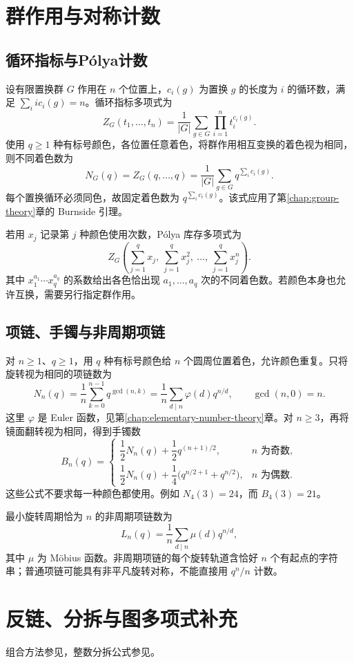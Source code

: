 \documentclass[../main.tex]{subfiles}
\begin{document}
\section{群作用与对称计数}
\subsection{循环指标与Pólya计数}
设有限置换群 $G$ 作用在 $n$ 个位置上，$c_i(g)$ 为置换 $g$ 的长度为 $i$ 的循环数，满足 $\sum_i i c_i(g)=n$。循环指标多项式为
\[
Z_G(t_1,\ldots,t_n)=\frac1{|G|}\sum_{g\in G}\prod_{i=1}^n t_i^{c_i(g)}.
\]
使用 $q\ge1$ 种有标号颜色，各位置任意着色，将群作用相互变换的着色视为相同，则不同着色数为
\[
N_G(q)=Z_G(q,\ldots,q)=\frac1{|G|}\sum_{g\in G}q^{\sum_i c_i(g)}.
\]
每个置换循环必须同色，故固定着色数为 $q^{\sum_i c_i(g)}$。该式应用了第\ref{chap:group-theory}章的 Burnside 引理。

若用 $x_j$ 记录第 $j$ 种颜色使用次数，Pólya 库存多项式为
\[
Z_G\!\left(\sum_{j=1}^q x_j,\ \sum_{j=1}^q x_j^2,\ \ldots,\ \sum_{j=1}^q x_j^n\right).
\]
其中 $x_1^{a_1}\cdots x_q^{a_q}$ 的系数给出各色恰出现 $a_1,\ldots,a_q$ 次的不同着色数。若颜色本身也允许互换，需要另行指定群作用。

\subsection{项链、手镯与非周期项链}
对 $n\ge1$、$q\ge1$，用 $q$ 种有标号颜色给 $n$ 个圆周位置着色，允许颜色重复。只将旋转视为相同的项链数为
\[
N_n(q)=\frac1n\sum_{k=0}^{n-1}q^{\gcd(n,k)}
=\frac1n\sum_{d\mid n}\varphi(d)q^{n/d},\qquad\gcd(n,0)=n.
\]
这里 $\varphi$ 是 Euler 函数，见第\ref{chap:elementary-number-theory}章。对 $n\ge3$，再将镜面翻转视为相同，得到手镯数
\[
B_n(q)=\begin{cases}
\dfrac12N_n(q)+\dfrac12q^{(n+1)/2},&n\text{ 为奇数},\\[4pt]
\dfrac12N_n(q)+\dfrac14\bigl(q^{n/2+1}+q^{n/2}\bigr),&n\text{ 为偶数}.
\end{cases}
\]
这些公式不要求每一种颜色都使用。例如 $N_4(3)=24$，而 $B_4(3)=21$。

最小旋转周期恰为 $n$ 的非周期项链数为
\[
L_n(q)=\frac1n\sum_{d\mid n}\mu(d)q^{n/d},
\]
其中 $\mu$ 为 Möbius 函数。非周期项链的每个旋转轨道含恰好 $n$ 个有起点的字符串；普通项链可能具有非平凡旋转对称，不能直接用 $q^n/n$ 计数。
\section{反链、分拆与图多项式补充}
组合方法参见\cite{cameron,mcs}，整数分拆公式参见\cite{dlmf}。
\end{document}

